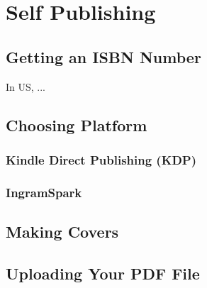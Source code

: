 
\chapter{Self Publishing}
\label{chapter:publishing}

\thispagestyle{empty}

\lipsum[2]


\minitoc
\newpage



\section{Getting an ISBN Number}

In US, ...




\section{Choosing Platform}


\subsection{Kindle Direct Publishing (KDP)}




\subsection{IngramSpark} 






\section{Making Covers} 






\section{Uploading Your PDF File}


